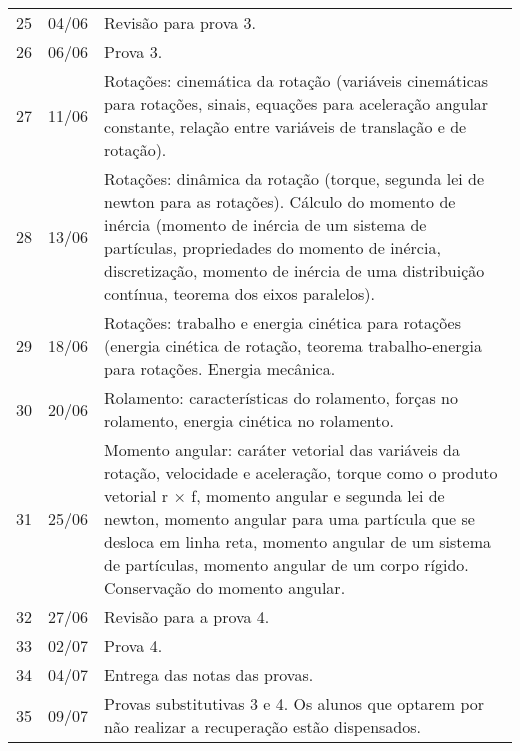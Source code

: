 \begin{center}
\begin{longtable}{ccp{70mm}}
25 & 04/06 & Revisão para prova 3. \\
26 & 06/06 & Prova 3. \\
27 & 11/06 & Rotações: cinemática da rotação (variáveis cinemáticas para rotações, sinais, equações para aceleração angular constante, relação entre variáveis de translação e de rotação). \\
28 & 13/06 & Rotações: dinâmica da rotação (torque, segunda lei de newton para as rotações). Cálculo do momento de inércia (momento de inércia de um sistema de partículas, propriedades do momento de inércia, discretização, momento de inércia de uma distribuição contínua, teorema dos eixos paralelos).  \\
29 & 18/06 & Rotações: trabalho e energia cinética para rotações (energia cinética de rotação, teorema trabalho-energia para rotações. Energia mecânica. \\
30 & 20/06 & Rolamento: características do rolamento, forças no rolamento, energia cinética no rolamento. \\
31 & 25/06 & Momento angular: caráter vetorial das variáveis da rotação, velocidade e aceleração, torque como o produto vetorial r × f, momento angular e segunda lei de newton, momento angular para uma partícula que se desloca em linha reta, momento angular de um sistema de partículas, momento angular de um corpo rígido. Conservação do momento angular. \\
32 & 27/06 & Revisão para a prova 4. \\
33 & 02/07 & Prova 4. \\
34 & 04/07 & Entrega das notas das provas. \\
35 & 09/07 & Provas substitutivas 3 e 4. Os alunos que optarem por não realizar a recuperação estão dispensados.
\end{longtable}
\end{center}
\cleardoublepage
